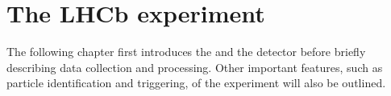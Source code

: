 \chapter{The LHCb experiment}
\label{ch:lhcb}

The following chapter first introduces the \lhc and the \lhcb detector before briefly
describing data collection and processing.
Other important features, such as particle identification and triggering, of the \lhcb experiment
will also be outlined.











\clearpage
